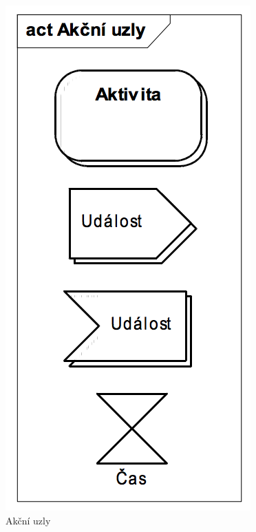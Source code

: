 \documentclass{szzclass}
\begin{document}
\begin{figure}[ht!]
\centering
\begin{minipage}{.5\textwidth}
  \centering
  \includegraphics[width=.75\linewidth]{topics/bi-wsi-si-18/images/akcni-uzly.png}
  \caption{Akční uzly}
\end{minipage}%
\begin{minipage}{.5\textwidth}
  \centering

\end{minipage}
\end{figure}
\end{document}
